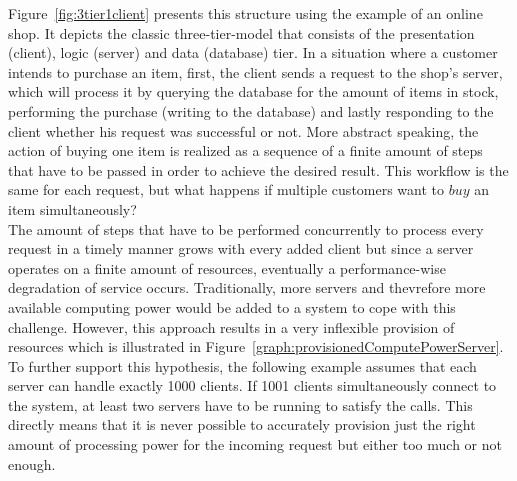 Figure~\vref{fig:3tier1client} presents this structure using the example of an online shop. It depicts the classic three-tier-model that consists of the presentation (client), logic (server) and data (database) tier.\autocite{Ramirez2000Three-TierArchitecture} In a situation where a customer intends to purchase an item, first, the client sends a request to the shop's server, which will process it by querying the database for the amount of items in stock, performing the purchase (writing to the database) and lastly responding to the client whether his request was successful or not. More abstract speaking, the action of buying one item is realized as a sequence of a finite amount of steps that have to be passed in order to achieve the desired result. This workflow is the same for each request, but what happens if multiple customers want to $buy$ an item simultaneously? \\
The amount of steps that have to be performed concurrently to process every request in a timely manner grows with every added client but since a server operates on a finite amount of resources, eventually a performance-wise degradation of service occurs. Traditionally, more servers and thevrefore more available computing power would be added to a system to cope with this challenge. However, this approach results in a very inflexible provision of resources which is illustrated in Figure~\vref{graph:provisionedComputePowerServer}. To further support this hypothesis, the following example assumes that each server can handle exactly 1000 clients. If 1001 clients simultaneously connect to the system, at least two servers have to be running to satisfy the calls. This directly means that it is never possible to accurately provision just the right amount of processing power for the incoming request but either too much or not enough. 

